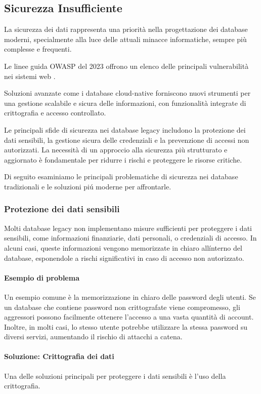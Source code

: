 \subsection{Sicurezza Insufficiente}
La sicurezza dei dati rappresenta una priorità nella progettazione dei database moderni, specialmente alla luce delle attuali minacce informatiche, sempre più complesse e frequenti.

Le linee guida OWASP del 2023 offrono un elenco delle principali vulnerabilità nei sistemi web \cite{OWA23}.

Soluzioni avanzate come i database cloud-native forniscono nuovi strumenti per una gestione scalabile e sicura delle informazioni, con funzionalità integrate di crittografia e accesso controllato.

Le principali sfide di sicurezza nei database legacy includono la protezione dei dati sensibili, la gestione sicura delle credenziali e la prevenzione di accessi non autorizzati. La necessità di un approccio alla sicurezza più strutturato e aggiornato è fondamentale per ridurre i rischi e proteggere le risorse critiche.


Di seguito esaminiamo le principali problematiche di sicurezza nei database tradizionali e le soluzioni pi\'u moderne per affrontarle.

\subsubsection{Protezione dei dati sensibili}
Molti database legacy non implementano misure sufficienti per proteggere i dati sensibili, come informazioni finanziarie, dati personali, o credenziali di accesso. In alcuni casi, queste informazioni vengono memorizzate in chiaro all\'interno del database, esponendole a rischi significativi in caso di accesso non autorizzato.

\paragraph{Esempio di problema}
Un esempio comune è la memorizzazione in chiaro delle password degli utenti. Se un database che contiene password non crittografate viene compromesso, gli aggressori possono facilmente ottenere l'accesso a una vasta quantità di account. Inoltre, in molti casi, lo stesso utente potrebbe utilizzare la stessa password su diversi servizi, aumentando il rischio di attacchi a catena.

\paragraph{Soluzione: Crittografia dei dati}
Una delle soluzioni principali per proteggere i dati sensibili è l'uso della crittografia. 

